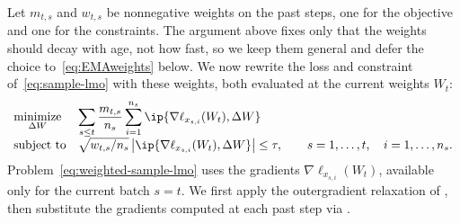 Let
$m_{t,s}$ and $w_{t,s}$ be nonnegative weights on the past steps, one
for the objective and one for the constraints. The argument above
fixes only that the weights should decay with age, not how fast,
so we keep them general and defer the choice to~\eqref{eq:EMAweights}
below. We now rewrite the loss and constraint of~\eqref{eq:sample-lmo}
with these weights, both evaluated at the current weights $W_t$:
\begin{equation}\label{eq:weighted-sample-lmo}
 \begin{array}{ll}
  \underset{\Delta W}{\mathrm{minimize}} &
  \displaystyle\sum_{s\le t} \frac{m_{t,s}}{n_s}\sum_{i=1}^{n_s}
    \ip{\nabla\ell_{x_{s,i}}(W_t), \Delta W} \\[2pt]
  \mbox{subject to} &
  \sqrt{w_{t,s}/n_s}\,\bigl|\ip{\nabla\ell_{x_{s,i}}(W_t), \Delta W}\bigr|
  \le \tau, \qquad s=1, \ldots, t,\quad i=1,\dots,n_s.
  \end{array}
\end{equation}
Problem~\eqref{eq:weighted-sample-lmo} uses the gradients
$\nabla\ell_{x_{s,i}}(W_t)$, available only for the current batch
$s=t$. We first apply the outergradient relaxation of
, then substitute the gradients computed at
each past step via .

